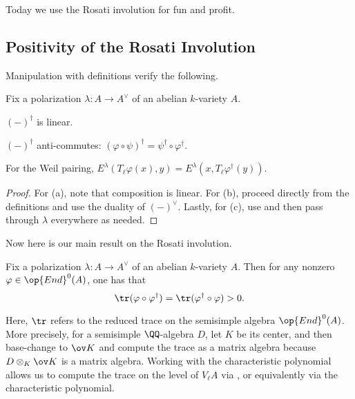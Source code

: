 \documentclass[../notes.tex]{subfiles}
\begin{document}
Today we use the Rosati involution for fun and profit.

\subsection{Positivity of the Rosati Involution}
Manipulation with definitions verify the following.
\begin{proposition}
	Fix a polarization $\lambda\colon A\to A^\lor$ of an abelian $k$-variety $A$.
	\begin{listalph}
		\item $(-)^\dagger$ is linear.
		\item $(-)^\dagger$ anti-commutes: $(\varphi\circ\psi)^\dagger=\psi^\dagger\circ\varphi^\dagger$.
		\item For the Weil pairing, $E^\lambda(T_\ell\varphi(x),y)=E^\lambda(x,T_\ell\varphi^\dagger(y))$.
	\end{listalph}
\end{proposition}
\begin{proof}
	For (a), note that composition is linear. For (b), proceed directly from the definitions and use the duality of $(-)^\lor$. Lastly, for (c), use  and then pass through $\lambda$ everywhere as needed.
\end{proof}
Now here is our main result on the Rosati involution.
\begin{theorem}[Positivity] \label{thm:positivity-rosati}
	Fix a polarization $\lambda\colon A\to A^\lor$ of an abelian $k$-variety $A$. Then for any nonzero $\varphi\in\op{End}^0(A)$, one has that
	\[\tr(\varphi\circ\varphi^\dagger)=\tr(\varphi^\dagger\circ\varphi)>0.\]
\end{theorem}
Here, $\tr$ refers to the reduced trace on the semisimple algebra $\op{End}^0(A)$. More precisely, for a semisimple $\QQ$-algebra $D$, let $K$ be its center, and then base-change to $\ov K$ and compute the trace as a matrix algebra because $D\otimes_K\ov K$ is a matrix algebra. Working with the characteristic polynomial allows us to compute the trace on the level of $V_\ell A$ via , or equivalently via the characteristic polynomial.
\end{document}
